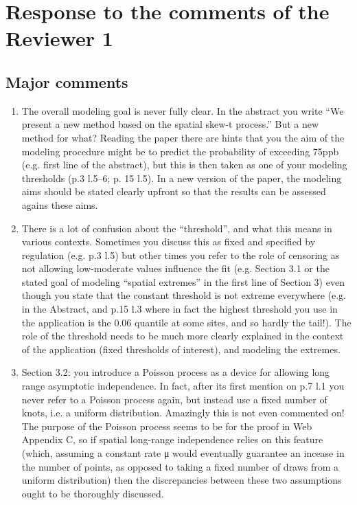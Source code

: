 \documentclass[11pt]{article}
\begin{document}
\newpage
\section*{Response to the comments of the Reviewer 1}

\subsection*{Major comments}
\begin{enumerate}[1.]
  \item The overall modeling goal is never fully clear. In the abstract you write ``We present a new method based on the spatial skew-t process.'' But a new method for what? Reading the paper there are hints that you the aim of the modeling procedure might be to predict the probability of exceeding 75ppb (e.g. first line of the abstract), but this is then taken as one of your modeling thresholds (p.3 l.5--6; p. 15 l.5). In a new version of the paper, the modeling aims should be stated clearly upfront so that the results can be assessed agains these aims.

  \item There is a lot of confusion about the ``threshold'', and what this means in various contexts. Sometimes you discuss this as fixed and specified by regulation (e.g. p.3 l.5) but other times you refer to the role of censoring as not allowing low-moderate values influence the fit (e.g. Section 3.1 or the stated goal of modeling ``spatial extremes'' in the first line of Section 3) even though you state that the constant threshold is not extreme everywhere (e.g. in the Abstract, and p.15 l.3 where in fact the highest threshold you use in the application is the 0.06 quantile at some sites, and so hardly the tail!). The role of the threshold needs to be much more clearly explained in the context of the application (fixed thresholds of interest), and modeling the extremes.

  \item Section 3.2: you introduce a Poisson process as a device for allowing long range asymptotic independence. In fact, after its first mention on p.7 l.1 you never refer to a Poisson process again, but instead use a fixed number of knots, i.e. a uniform distribution. Amazingly this is not even commented on! The purpose of the Poisson process seems to be for the proof in Web Appendix C, so if spatial long-range independence relies on this feature (which, assuming a constant rate μ would eventually guarantee an incease in the number of points, as opposed to taking a fixed number of draws from a uniform distribution) then the discrepancies between these two assumptions ought to be thoroughly discussed.


\end{enumerate}
\end{document}
